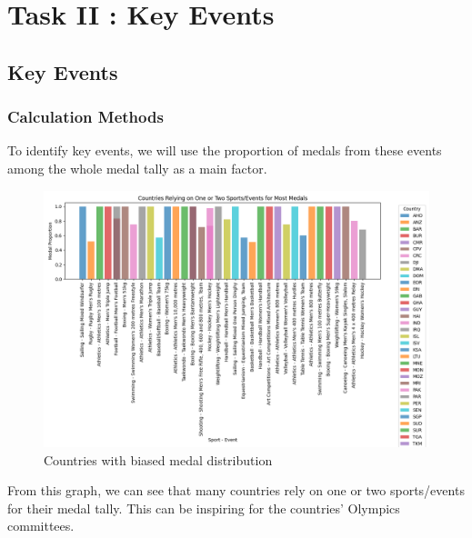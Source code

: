 \section{Task II : Key Events}
\subsection{Key Events}
\subsubsection{Calculation Methods}
To identify key events, we will use the proportion of medals from these events among the whole medal tally as a main factor.

\begin{figure}[htbp]
    \centering
    \includegraphics[width=1.1\textwidth]{./figures/Key_event.png}
    \caption{ Countries with biased medal distribution}
    \label{fig:Key_event}
\end{figure}

From this graph, we can see that many countries rely on one or two sports/events for their medal tally. This can be inspiring for the countries' Olympics committees.
